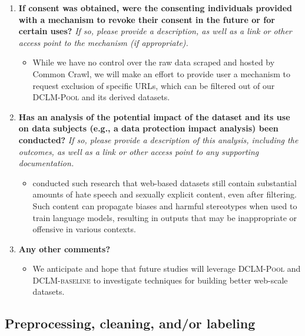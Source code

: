 \documentclass{article}
\newcommand{\rawpool}{\textsc{DCLM-Pool}\xspace}
\newcommand{\hqpool}{\textsc{DCLM-baseline}\xspace}
\newcommand{\commoncrawl}{Common Crawl\xspace}
\begin{document}
\begin{enumerate}[label=Q\arabic*, resume]
\item \textbf{If consent was obtained, were the consenting individuals provided with a mechanism to revoke their consent in the future or for certain uses?} \textit{If so, please provide a description, as well as a link or other access point to the mechanism (if appropriate).}

\begin{itemize}
\item While we have no control over the raw data scraped and hosted by \commoncrawl, we will make an effort to provide user a mechanism to request exclusion of specific URLs, which can be filtered out of our \rawpool and its derived datasets.
\end{itemize}

\item \textbf{Has an analysis of the potential impact of the dataset and its use on data subjects (e.g., a data protection impact analysis) been conducted?} \textit{If so, please provide a description of this analysis, including the outcomes, as well as a link or other access point to any supporting documentation.}

\begin{itemize}
\item \citet{Luccioni2021WhatsIT,Bender2021OnTD} conducted such research that web-based datasets still contain substantial amounts of hate speech and sexually explicit content, even after filtering. Such content can propagate biases and harmful stereotypes when used to train language models, resulting in outputs that may be inappropriate or offensive in various contexts.
\end{itemize}

\item \textbf{Any other comments?}

\begin{itemize}
\item We anticipate and hope that future studies will leverage \rawpool and \hqpool to investigate techniques for building better web-scale datasets.
\end{itemize}

\end{enumerate}

\subsection{Preprocessing, cleaning, and/or labeling}
\end{document}
